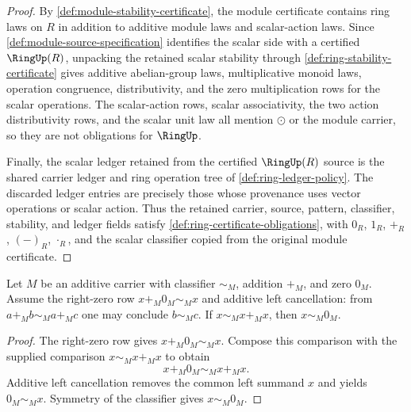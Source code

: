 \begin{proof}
By \autoref{def:module-stability-certificate}, the module certificate contains ring laws on $R$ in addition to additive module laws and scalar-action laws. Since \autoref{def:module-source-specification} identifies the scalar side with a certified $\RingUp(R)$, unpacking the retained scalar stability through \autoref{def:ring-stability-certificate} gives additive abelian-group laws, multiplicative monoid laws, operation congruence, distributivity, and the zero multiplication rows for the scalar operations. The scalar-action rows, scalar associativity, the two action distributivity rows, and the scalar unit law all mention $\odot$ or the module carrier, so they are not obligations for $\RingUp$.

Finally, the scalar ledger retained from the certified $\RingUp(R)$ source is the shared carrier ledger and ring operation tree of \autoref{def:ring-ledger-policy}. The discarded ledger entries are precisely those whose provenance uses vector operations or scalar action. Thus the retained carrier, source, pattern, classifier, stability, and ledger fields satisfy \autoref{def:ring-certificate-obligations}, with $0_R$, $1_R$, $+_R$, $(-)_R$, $\cdot_R$, and the scalar classifier copied from the original module certificate.
\end{proof}

\begin{lemma}
\label{thm:module-additive-duplicate-cancel-empty}
Let $M$ be an additive carrier with classifier $\sim_M$, addition $+_M$, and zero $0_M$. Assume the right-zero row $x+_M0_M\sim_M x$ and additive left cancellation: from $a+_M b\sim_M a+_M c$ one may conclude $b\sim_M c$. If $x\sim_M x+_M x$, then $x\sim_M0_M$.
\end{lemma}
\begin{proof}
The right-zero row gives $x+_M0_M\sim_M x$. Compose this comparison with the supplied comparison $x\sim_M x+_M x$ to obtain
$$
x+_M0_M\sim_M x+_M x.
$$
Additive left cancellation removes the common left summand $x$ and yields $0_M\sim_M x$. Symmetry of the classifier gives $x\sim_M0_M$.
\end{proof}

